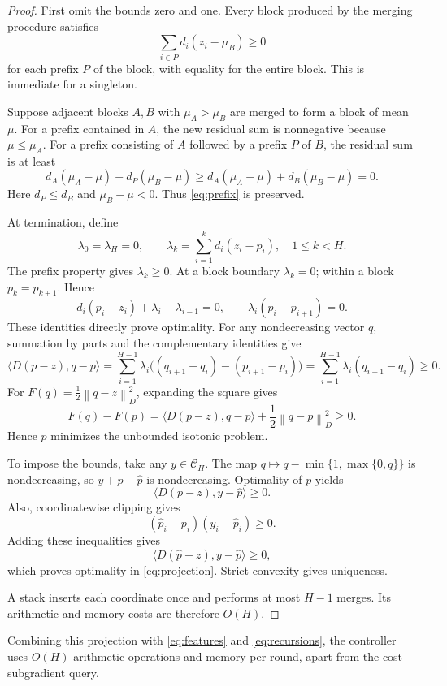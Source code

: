 \documentclass[11pt]{article}
\newcommand{\CH}{\mathcal C_H}
\newcommand{\normD}[1]{\left\lVert #1\right\rVert_D}
\begin{document}
\begin{proof}
First omit the bounds zero and one. Every block produced by the
merging procedure satisfies
\begin{equation}
\label{eq:prefix}
\sum_{i\in P}d_i(z_i-\mu_B)\ge0
\end{equation}
for each prefix $P$ of the block, with equality for the entire
block. This is immediate for a singleton.

Suppose adjacent blocks $A,B$ with $\mu_A>\mu_B$ are merged
to form a block of mean $\mu$. For a prefix contained in $A$,
the new residual sum is nonnegative because $\mu\le\mu_A$.
For a prefix consisting of $A$ followed by a prefix $P$ of $B$,
the residual sum is at least
\[
d_A(\mu_A-\mu)+d_P(\mu_B-\mu)
\ge d_A(\mu_A-\mu)+d_B(\mu_B-\mu)=0.
\]
Here $d_P\le d_B$ and $\mu_B-\mu<0$.
Thus \eqref{eq:prefix} is preserved.

At termination, define
\[
\lambda_0=\lambda_H=0,
\qquad
\lambda_k=\sum_{i=1}^k d_i(z_i-p_i),
\quad 1\le k<H.
\]
The prefix property gives $\lambda_k\ge0$. At a block boundary
$\lambda_k=0$; within a block $p_k=p_{k+1}$. Hence
\[
d_i(p_i-z_i)+\lambda_i-\lambda_{i-1}=0,
\qquad
\lambda_i(p_i-p_{i+1})=0.
\]
These identities directly prove optimality. For any nondecreasing
vector $q$, summation by parts and the complementary identities give
\[
\langle D(p-z),q-p\rangle
=\sum_{i=1}^{H-1}\lambda_i
\bigl((q_{i+1}-q_i)-(p_{i+1}-p_i)\bigr)
=\sum_{i=1}^{H-1}\lambda_i(q_{i+1}-q_i)\ge0.
\]
For $F(q)=\frac12\normD{q-z}^2$, expanding the square gives
\[
F(q)-F(p)
=\langle D(p-z),q-p\rangle+\frac12\normD{q-p}^2\ge0.
\]
Hence $p$ minimizes the unbounded isotonic problem.

To impose the bounds, take any $y\in\CH$.
The map $q\mapsto q-\min\{1,\max\{0,q\}\}$ is nondecreasing,
so $y+p-\widehat p$ is nondecreasing. Optimality of $p$ yields
\[
\langle D(p-z),y-\widehat p\rangle\ge0.
\]
Also, coordinatewise clipping gives
\[
(\widehat p_i-p_i)(y_i-\widehat p_i)\ge0.
\]
Adding these inequalities gives
\[
\langle D(\widehat p-z),y-\widehat p\rangle\ge0,
\]
which proves optimality in \eqref{eq:projection}.
Strict convexity gives uniqueness.

A stack inserts each coordinate once and performs at most
$H-1$ merges. Its arithmetic and memory costs are therefore
$O(H)$.
\end{proof}

Combining this projection with \eqref{eq:features} and
\eqref{eq:recursions}, the controller uses $O(H)$ arithmetic
operations and memory per round, apart from the cost-subgradient
query.
\end{document}
